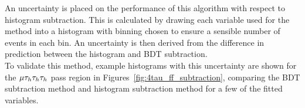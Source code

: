 An uncertainty is placed on the performance of this algorithm with respect to histogram subtraction.
This is calculated by drawing each variable used for the method into a histogram with binning chosen to ensure a sensible number of events in each bin.
An uncertainty is then derived from the difference in prediction between the histogram and \ac{BDT} subtraction. \\

To validate this method, example histograms with this uncertainty are shown for the $\mu\tau_{h}\tau_{h}\tau_{h}$ pass region in Figures~\ref{fig:4tau_ff_subtraction}, comparing the \ac{BDT} subtraction method and histogram subtraction method for a few of the fitted variables. \\

\begin{figure}[!hbtp]
\centering
     \\

\end{figure}
